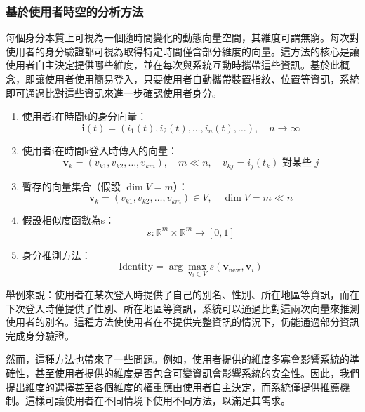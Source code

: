 \subsubsection{基於使用者時空的分析方法}
每個身分本質上可視為一個隨時間變化的動態向量空間，其維度可謂無窮。每次對使用者的身分驗證都可視為取得特定時間僅含部分維度的向量。這方法的核心是讓使用者自主決定提供哪些維度，並在每次與系統互動時攜帶這些資訊。基於此概念，即讓使用者使用簡易登入，只要使用者自動攜帶裝置指紋、位置等資訊，系統即可通過比對這些資訊來進一步確認使用者身分。
\begin{enumerate}
  \item 使用者i在時間t的身分向量：
        \begin{equation}
          \mathbf{i}(t) = (i_1(t), i_2(t), \ldots, i_n(t), \ldots), \quad n \to \infty
        \end{equation}
  \item 使用者i在時間k登入時傳入的向量：
        \begin{equation}
          \mathbf{v}_k = (v_{k1}, v_{k2}, \ldots, v_{km}), \quad m \ll n, \quad v_{kj} = i_j(t_k) \text{ 對某些 } j
        \end{equation}
  \item 暫存的向量集合（假設 $\dim V = m$）：
        \begin{equation}
          \mathbf{v}_k = (v_{k1}, v_{k2}, \ldots, v_{km}) \in V, \quad \dim V = m \ll n
        \end{equation}
  \item 假設相似度函數為s：
        \begin{equation}
          s: \mathbb{R}^m \times \mathbb{R}^m \to [0, 1]
        \end{equation}
  \item 身分推測方法：
        \begin{equation}
          \text{Identity} = \arg\max_{\mathbf{v}_i \in V} s(\mathbf{v}_{\text{new}}, \mathbf{v}_i)
        \end{equation}
\end{enumerate}
舉例來說：使用者在某次登入時提供了自己的別名、性別、所在地區等資訊，而在下次登入時僅提供了性別、所在地區等資訊，系統可以通過比對這兩次向量來推測使用者的別名。這種方法使使用者在不提供完整資訊的情況下，仍能通過部分資訊完成身分驗證。

然而，這種方法也帶來了一些問題。例如，使用者提供的維度多寡會影響系統的準確性，甚至使用者提供的維度是否包含可變資訊會影響系統的安全性。因此，我們提出維度的選擇甚至各個維度的權重應由使用者自主決定，而系統僅提供推薦機制。這樣可讓使用者在不同情境下使用不同方法，以滿足其需求。
